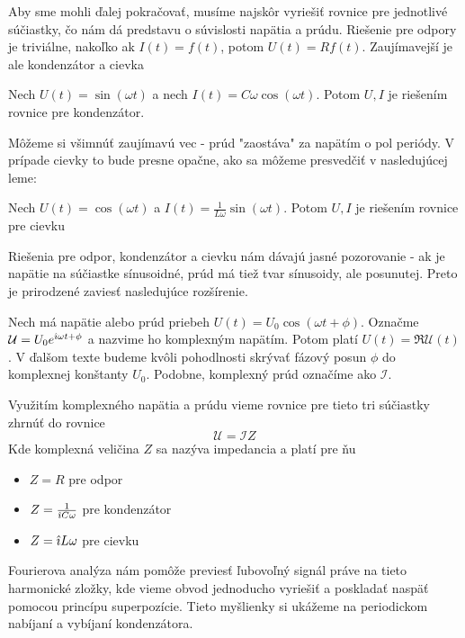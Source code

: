 Aby sme mohli ďalej pokračovať, musíme najskôr vyriešiť rovnice pre
jednotlivé súčiastky, čo nám dá predstavu o súvislosti napätia a
prúdu. Riešenie pre odpory je triviálne, nakoľko ak $I(t)=f(t)$, potom
$U(t)=R f(t)$. Zaujímavejší je ale kondenzátor a cievka
\begin{lema}
    Nech $U(t) = \sin (\omega t)$ a nech $I(t) = C\omega \cos (\omega t)$.
    Potom $U,I$ je riešením rovnice pre kondenzátor.
\end{lema}
Môžeme si všimnúť zaujímavú vec - prúd "zaostáva" za napätím o pol
periódy. V prípade cievky to bude presne opačne, ako sa môžeme
presvedčiť v nasledujúcej leme:
\begin{lema}
 Nech $U(t) = \cos (\omega t)$ a $I(t) = \frac{1}{L \omega} \sin (\omega t)$.
 Potom $U,I$ je riešením rovnice pre cievku
\end{lema}

Riešenia pre odpor, kondenzátor a cievku nám dávajú jasné pozorovanie
- ak je napätie na súčiastke sínusoidné, prúd má tiež tvar sínusoidy,
  ale posunutej. Preto je prirodzené zaviesť nasledujúce rozšírenie.

\begin{definicia}
    Nech má napätie alebo prúd priebeh $U(t) = U_0 \cos(\omega t +
    \phi)$. Označme
    $\mathcal{U} = U_0 e^{\hat{\imath} \omega t + \phi}$ a nazvime ho komplexným
    napätím. Potom platí $U(t) = \Re \mathcal{U}(t)$. V ďalšom texte
    budeme kvôli pohodlnosti 
    skrývať fázový posun $\phi$ do komplexnej konštanty $U_0$.
    Podobne, komplexný prúd označíme ako $\mathcal{I}$.
\end{definicia}

Využitím komplexného napätia a prúdu vieme rovnice pre tieto tri
súčiastky zhrnúť do rovnice
\begin{equation}
    \mathcal{U} = \mathcal{I} Z
\end{equation}
Kde komplexná veličina $Z$ sa nazýva impedancia a platí pre ňu
\begin{itemize}
   \item $Z=R$ pre odpor
   \item $Z=\frac{1}{\hat{\imath} C \omega}$ pre kondenzátor
   \item $Z=\hat{\imath} L \omega$ pre cievku
\end{itemize}

Fourierova analýza nám pomôže previesť ľubovoľný signál práve na tieto
harmonické zložky, kde vieme obvod jednoducho vyriešiť a poskladať
naspäť pomocou princípu superpozície. Tieto myšlienky si ukážeme na
periodickom nabíjaní a vybíjaní kondenzátora.

